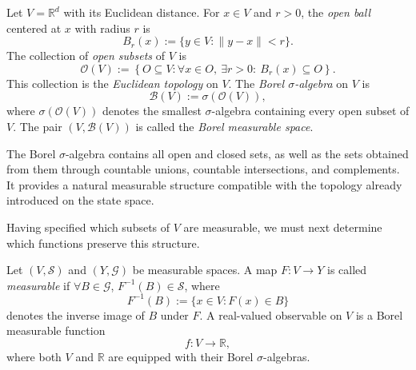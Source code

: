 \documentclass[12pt,a4paper,oneside]{book}
\begin{document}
\begin{definition}
Let $V=\mathbb R^d$ with its Euclidean distance. For $x\in V$ and $r>0$, the \emph{open ball} centered at $x$ with radius
$r$ is
\begin{equation*}
    B_r(x):=\{y\in V:\|y-x\|<r\}.
\end{equation*}
The collection of \emph{open subsets} of $V$ is
\begin{equation*}
\mathcal O(V):=
    \left\{
        O\subseteq V: \forall x\in O,\ \exists r>0:\ B_r(x)\subseteq O
    \right\}.
\end{equation*}
This collection is the \emph{Euclidean topology} on $V$. The \emph{Borel $\sigma$-algebra} on $V$ is
\begin{equation*}
    \mathcal B(V):=\sigma(\mathcal O(V)),
\end{equation*}
where $\sigma(\mathcal O(V))$ denotes the smallest $\sigma$-algebra containing every open subset of $V$. The pair $(V,\mathcal B(V))$
is called the \emph{Borel measurable space}.
\end{definition}

The Borel $\sigma$-algebra contains all open and closed sets, as well as the sets obtained from them through countable
unions, countable intersections, and complements. It provides a natural measurable structure compatible with the topology
already introduced on the state space.

Having specified which subsets of $V$ are measurable, we must next determine which functions preserve this structure.

\begin{definition}
Let $(V,\mathcal S)$ and $(Y,\mathcal G)$ be measurable spaces. A map $F:V\to Y$ is called \emph{measurable} if $\forall B\in\mathcal G$,
$F^{-1}(B)\in\mathcal S$, where
\begin{equation*}
    F^{-1}(B) := \{x\in V:F(x)\in B\}
\end{equation*}
denotes the inverse image of $B$ under $F$. A real-valued observable on $V$ is a Borel measurable function
\begin{equation*}
    f:V\to\mathbb R,
\end{equation*}
where both $V$ and $\mathbb R$ are equipped with their Borel $\sigma$-algebras.
\end{definition}
\end{document}
